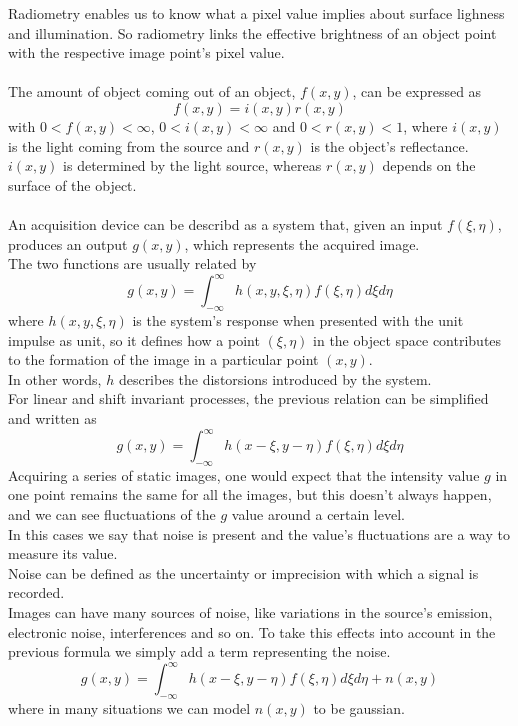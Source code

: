 Radiometry enables us to know what a pixel value implies about surface lighness and illumination. So radiometry links the effective brightness of an object point with the respective image point's pixel value. \\ \\
The amount of object coming out of an object, $f(x,y)$, can be expressed as 
$$
	f(x,y) = i(x,y)r(x,y)
$$
with $0 < f(x,y) < \infty$, $0 < i(x,y) < \infty$ and $0 < r(x,y) < 1$, where $i(x,y)$ is the light coming from the source and $r(x,y)$ is the object's reflectance. \\
$i(x,y)$ is determined by the light source, whereas $r(x,y)$ depends on the surface of the object. \\ \\
An acquisition device can be describd as a system that, given an input $f(\xi,\eta)$, produces an output $g(x,y)$, which represents the acquired image. \\
The two functions are usually related by
$$
	g(x,y) = \int_{-\infty}^\infty h(x,y,\xi,\eta)f(\xi,\eta)d\xi d\eta
$$
where $h(x,y,\xi,\eta)$ is the system's response when presented with the unit impulse as unit, so it defines how a point $(\xi,\eta)$ in the object space contributes to the formation of the image in a particular point $(x,y)$. \\
In other words, $h$ describes the distorsions introduced by the system. \\ 
For linear and shift invariant processes, the previous relation can be simplified and written as
$$
	g(x,y) = \int_{-\infty}^\infty h(x - \xi,y - \eta)f(\xi,\eta)d\xi d\eta
$$ 
Acquiring a series of static images, one would expect that the intensity value $g$ in one point remains the same for all the images, but this doesn't always happen, and we can see fluctuations of the $g$ value around a certain level. \\
In this cases we say that noise is present and the value's fluctuations are a way to measure its value. \\
Noise can be defined as the uncertainty or imprecision with which a signal is recorded. \\
Images can have many sources of noise, like variations in the source's emission, electronic noise, interferences and so on. To take this effects into account in the previous formula we simply add a term representing the noise.
$$
	g(x,y) = \int_{-\infty}^\infty h(x - \xi,y - \eta)f(\xi,\eta)d\xi d\eta + n(x,y)
$$ 
where in many situations we can model $n(x,y)$ to be gaussian.
